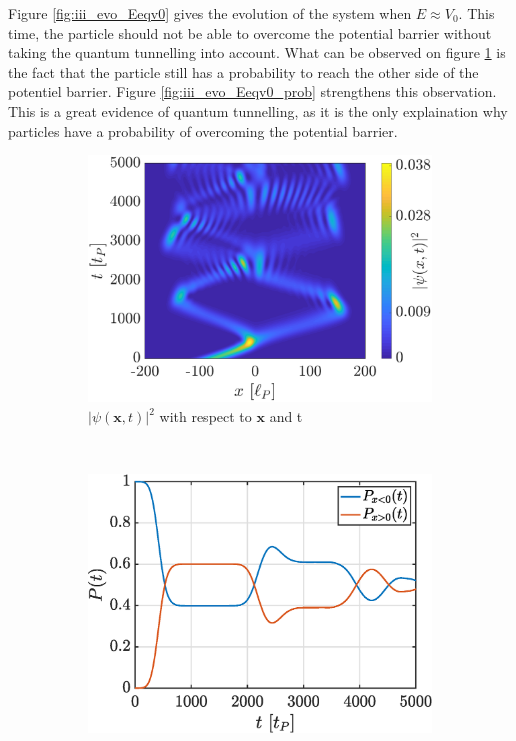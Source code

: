 \documentclass[a4paper,12pt,twoside]{article}
\newcommand{\mbf}[1]{\mathbf{#1}} %
\begin{document}
    Figure \ref{fig:iii_evo_Eeqv0} gives the evolution of the system when $E \approx V_0$.
    This time, the particle should not be able to overcome the potential barrier without taking the quantum tunnelling into account.
    What can be observed on figure \ref{fig:iii_evo_Eeqv0_evo} is the fact that the particle still has a probability to reach the other side of the potentiel barrier.
    Figure \ref{fig:iii_evo_Eeqv0_prob} strengthens this observation.
    This is a great evidence of quantum tunnelling, as it is the only explaination why particles have a probability of overcoming the potential barrier.\\


    \begin{figure}[h]
      \centering
      \begin{subfigure}[t]{0.45\textwidth}
        \includegraphics[width=\textwidth]{graphs/iii_evo_Eeqv0_evo.eps}
        \caption{$|\psi(\mbf{x}, t)|^2$ with respect to $\mbf{x}$ and t}
        \label{fig:iii_evo_Eeqv0_evo}
      \end{subfigure}
      ~
      \begin{subfigure}[t]{0.45\textwidth}
        \includegraphics[width=\textwidth]{graphs/iii_evo_Eeqv0_prob.eps}

\end{subfigure}
\end{figure}
\end{document}
